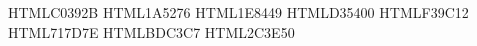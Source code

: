 
\definecolor{pse-rouge}    {HTML}{C0392B}  %
\definecolor{pse-bleu}     {HTML}{1A5276}  %
\definecolor{pse-vert}     {HTML}{1E8449}  %
\definecolor{pse-orange}   {HTML}{D35400}  %
\definecolor{pse-jaune}    {HTML}{F39C12}  %
\definecolor{pse-gris}     {HTML}{717D7E}  %
\definecolor{pse-ligne}    {HTML}{BDC3C7}  %
\definecolor{pse-titre-bg} {HTML}{2C3E50}  %
